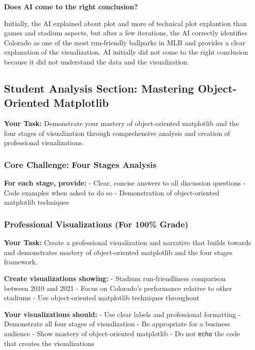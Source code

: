 \documentclass[
  letterpaper,
  DIV=11,
  numbers=noendperiod]{scrartcl}
\begin{document}
\begin{tcolorbox}
\textbf{Does AI come to the right conclusion?}

Initially, the AI explained about plot and more of technical plot
explantion than games and stadium aspects, but after a few iterations,
the AI correctly identifies Colorado as one of the most run-friendly
ballparks in MLB and provides a clear explanation of the visualization.
AI initially did not come to the right conclusion because it did not
understand the data and the visualization.

\end{tcolorbox}

\subsection{Student Analysis Section: Mastering Object-Oriented
Matplotlib}\label{student-analysis-section}

\textbf{Your Task:} Demonstrate your mastery of object-oriented
matplotlib and the four stages of visualization through comprehensive
analysis and creation of professional visualizations.

\subsubsection{Core Challenge: Four Stages
Analysis}\label{core-challenge-four-stages-analysis}

\textbf{For each stage, provide:} - Clear, concise answers to all
discussion questions - Code examples when asked to do so - Demonstration
of object-oriented matplotlib techniques

\subsubsection{Professional Visualizations (For 100\%
Grade)}\label{professional-visualizations-for-100-grade}

\textbf{Your Task:} Create a professional visualization and narrative
that builds towards and demonstrates mastery of object-oriented
matplotlib and the four stages framework.

\textbf{Create visualizations showing:} - Stadium run-friendliness
comparison between 2010 and 2021 - Focus on Colorado's performance
relative to other stadiums - Use object-oriented matplotlib techniques
throughout

\textbf{Your visualizations should:} - Use clear labels and professional
formatting - Demonstrate all four stages of visualization - Be
appropriate for a business audience - Show mastery of object-oriented
matplotlib - Do not \texttt{echo} the code that creates the
visualizations
\end{document}
